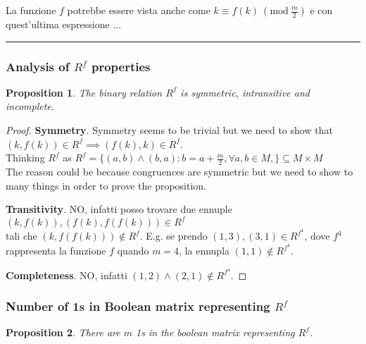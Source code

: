\documentclass{article}
\newtheorem{prop}{Proposition}
\begin{document}
La funzione $f$ potrebbe essere vista anche come $k \equiv f(k)\ (\textrm{mod}\ \frac{m}{2})$ e con quest'ultima espressione ...

\noindent
{\color{blue} \rule{\linewidth}{0.5mm} }
\subsubsection{Analysis of $R^f$ properties}

\begin{prop}
 The binary relation $R^f$ is symmetric, intransitive and incomplete.
\end{prop}

\begin{proof}
  \textbf{Symmetry}. Symmetry seems to be trivial but we need to show that $(k, f(k)) \in R^f \implies (f(k), k) \in R^f$. \\
  Thinking $R^f$ as $R^f = \{(a,b) \wedge (b, a) : b = a + \frac{m}{2}, \forall a, b \in M, \} \subseteq M \times M$ \\
  The reason could be because congruences are symmetric but we need to show to many things in order to prove the proposition.
  
  \medskip
  
  \textbf{Transitivity}. NO, infatti posso trovare due ennuple $(k, f(k)), (f(k),f(f(k))) \in R^f$ \\
 tali che $(k, f(f(k))) \not\in R^f$. E.g. se prendo $(1,3), (3,1) \in R^{f^4}$, dove $f^4$ rappresenta la funzione $f$ quando $m=4$, la ennupla $(1,1) \not\in R^{f^4}$.
 
  \medskip
  
  \textbf{Completeness}. NO, infatti $(1,2) \wedge (2,1) \not\in R^{f^4}$.
\end{proof}

\subsubsection{Number of 1s in Boolean matrix representing $R^f$}
\begin{prop}
There are $m$ 1s in the boolean matrix representing $R^f$.
\end{prop}
\end{document}
